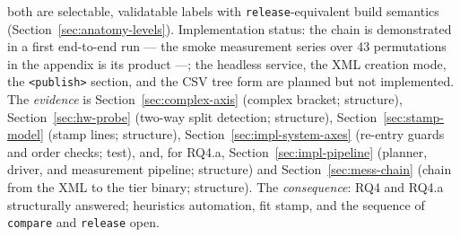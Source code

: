 \begin{nurlang}
both are selectable, validatable labels with \texttt{release}-equivalent build semantics
(Section~\ref{sec:anatomy-levels}).
Implementation status: the chain is demonstrated in a first end-to-end run --- the smoke
measurement series over 43 permutations in the appendix is its product ---; the headless service,
the XML creation mode, the \texttt{<publish>} section, and the CSV tree form are planned but not
implemented. The \emph{evidence} is Section~\ref{sec:complex-axis} (complex bracket; structure),
Section~\ref{sec:hw-probe} (two-way split detection; structure), Section~\ref{sec:stamp-model}
(stamp lines; structure), Section~\ref{sec:impl-system-axes} (re-entry guards and order checks;
test), and, for RQ4.a, Section~\ref{sec:impl-pipeline} (planner, driver, and measurement pipeline;
structure) and Section~\ref{sec:mess-chain} (chain from the XML to the tier binary; structure).
The \emph{consequence}: RQ4 and RQ4.a structurally answered; heuristics automation, fit stamp, and
the sequence of \texttt{compare} and \texttt{release} open.
\end{nurlang}
